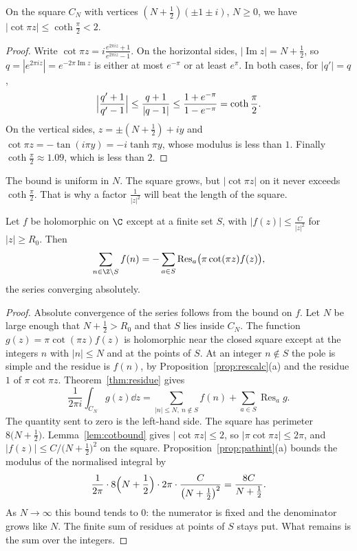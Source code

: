 \begin{lemma}\label{lem:cotbound}
On the square $C_N$ with vertices $(N+\frac12)(\pm1\pm i)$, $N\ge0$, we have $|\cot\pi z|\le\coth\frac\pi2<2$.
\end{lemma}
\begin{proof}
Write $\cot\pi z=i\frac{e^{2\pi iz}+1}{e^{2\pi iz}-1}$. On the horizontal sides, $|\operatorname{Im}z|=N+\frac12$, so $q=|e^{2\pi iz}|=e^{-2\pi\operatorname{Im}z}$ is either at most $e^{-\pi}$ or at least $e^\pi$. In both cases, for $|q'|=q$,
\[
\Bigl|\frac{q'+1}{q'-1}\Bigr|\le\frac{q+1}{|q-1|}\le\frac{1+e^{-\pi}}{1-e^{-\pi}}=\coth\frac\pi2.
\]
On the vertical sides, $z=\pm(N+\frac12)+iy$ and $\cot\pi z=-\tan(i\pi y)=-i\tanh\pi y$, whose modulus is less than $1$. Finally $\coth\frac\pi2\approx1.09$, which is less than $2$.
\end{proof}

The bound is uniform in $N$. The square grows, but $|\cot\pi z|$ on it never exceeds $\coth\frac\pi2$. That is why a factor $\frac1{|z|^2}$ will beat the length of the square.

\begin{theorem}\label{thm:residuesum}
Let $f$ be holomorphic on $\C$ except at a finite set $S$, with $|f(z)|\le\frac C{|z|^2}$ for $|z|\ge R_0$. Then
\[
\sum_{n\in\Z\setminus S}f(n)=-\sum_{a\in S}\operatorname{Res}_a\bigl(\pi\cot(\pi z)f(z)\bigr),
\]
the series converging absolutely.
\end{theorem}
\begin{proof}
Absolute convergence of the series follows from the bound on $f$. Let $N$ be large enough that $N+\frac12>R_0$ and that $S$ lies inside $C_N$. The function $g(z)=\pi\cot(\pi z)f(z)$ is holomorphic near the closed square except at the integers $n$ with $|n|\le N$ and at the points of $S$. At an integer $n\notin S$ the pole is simple and the residue is $f(n)$, by Proposition~\ref{prop:rescalc}(a) and the residue $1$ of $\pi\cot\pi z$. Theorem~\ref{thm:residue} gives
\[
\frac1{2\pi i}\int_{C_N}g(z)\dd z=\sum_{|n|\le N,\ n\notin S}f(n)+\sum_{a\in S}\operatorname{Res}_ag.
\]
The quantity sent to zero is the left-hand side. The square has perimeter $8\bigl(N+\frac12\bigr)$. Lemma~\ref{lem:cotbound} gives $|\cot\pi z|\le2$, so $|\pi\cot\pi z|\le2\pi$, and $|f(z)|\le C\big/\bigl(N+\frac12\bigr)^2$ on the square. Proposition~\ref{prop:pathint}(a) bounds the modulus of the normalised integral by
\[
\frac1{2\pi}\cdot 8\Bigl(N+\frac12\Bigr)\cdot 2\pi\cdot\frac C{\bigl(N+\tfrac12\bigr)^2}=\frac{8C}{N+\tfrac12}.
\]
As $N\to\infty$ this bound tends to $0$: the numerator is fixed and the denominator grows like $N$. The finite sum of residues at points of $S$ stays put. What remains is the sum over the integers.
\end{proof}


